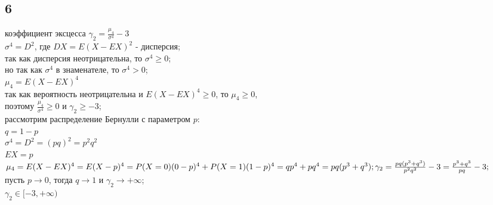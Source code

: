 \documentclass{article}
\begin{document}
\begin{large}
	\section*{6}
	коэффициент эксцесса $\gamma_2=\frac{\mu_4}{\sigma^4}-3$\\
	$\sigma^4=D^2$, где $DX=E(X-EX)^2$ - дисперсия;\\
	так как дисперсия неотрицательна, то $\sigma^4\ge0$;\\
	но так как $\sigma^4$ в знаменателе, то $\sigma^4>0$;\\
	$\mu_4=E(X-EX)^4$\\
	так как вероятность неотрицательна и $E(X-EX)^4\ge0$, то $\mu_4\ge0$,\\
	поэтому $\frac{\mu_4}{\sigma^4}\ge0$ и $\gamma_2\ge-3$;\\
	рассмотрим распределение Бернулли с параметром $p$:\\
	$q=1-p$\\
	$\sigma^4=D^2=(pq)^2=p^2q^2$\\
	$EX=p$\\
	$
	\mu_4=E(X-EX)^4=\\
	E(X-p)^4=\\
	P(X=0)(0-p)^4+P(X=1)(1-p)^4=\\
	qp^4+pq^4=\\
	pq(p^3+q^3);\\
	\gamma_2=\frac{pq(p^3+q^3)}{p^2q^2}-3=\\
	\frac{p^3+q^3}{pq}-3;
	$\\
	пусть $p\rightarrow0$, тогда $q\rightarrow1$ и $\gamma_2\rightarrow+\infty$;\\
	$\gamma_2\in[-3,+\infty)$
	\end{large}
\end{document}
